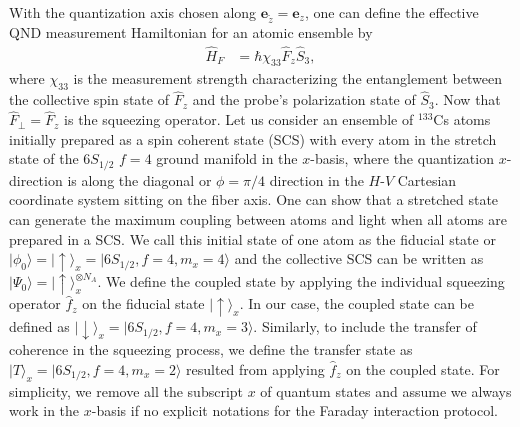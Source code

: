 \documentclass[aps,pra,twocolumn,superscriptaddress]{revtex4-1} %
\def\ket#1{\lvert{#1}\rangle}%
\begin{document}
With the quantization axis chosen along $ \mathbf{e}_{\tilde{z}}=\mathbf{e}_z $, one can define the effective QND measurement Hamiltonian for an atomic ensemble by
\begin{align}
\hat{H}_F &= \hbar \chi_{33}\hat{F}_z \hat{S}_3,
\end{align}
where $ \chi_{33} $ is the measurement strength characterizing the entanglement between the collective spin state of $ \hat{F}_z $ and the probe's polarization state of $ \hat{S}_3 $.
Now that $ \hat{F}_\perp=\hat{F}_z $ is the squeezing operator. 
Let us consider an ensemble of $ ^{133} $Cs atoms initially prepared as a spin coherent state (SCS) with every atom in the stretch state of the $ 6S_{1/2}$ $f=4 $ ground manifold in the $ x $-basis, where the quantization $ x $-direction is along the diagonal or $ \phi=\pi/4 $ direction in the $ H $-$ V $ Cartesian coordinate system sitting on the fiber axis.
One can show that a stretched state can generate the maximum coupling between atoms and light when all atoms are prepared in a SCS.
We call this initial state of one atom as the fiducial state or $ \ket{\phi_0}=\ket{\uparrow}_x = \ket{6S_{1/2},f=4,m_x=4} $ and the collective SCS can be written as $ \ket{\Psi_0}=\ket{\uparrow}_x^{\otimes N_A} $.
We define the coupled state by applying the individual squeezing operator $ \hat{f}_z$ on the fiducial state $\ket{\uparrow}_x $.
In our case, the coupled state can be defined as $ \ket{\downarrow}_x=\ket{6S_{1/2},f=4,m_x=3} $.
Similarly, to include the transfer of coherence in the squeezing process, we define the transfer state as $ \ket{T}_x=\ket{6S_{1/2},f=4,m_x=2} $ resulted from applying $ \hat{f}_z$ on the coupled state. 
For simplicity, we remove all the subscript $ x $ of quantum states and assume we always work in the $ x $-basis if no explicit notations for the Faraday interaction protocol. 
\end{document}
